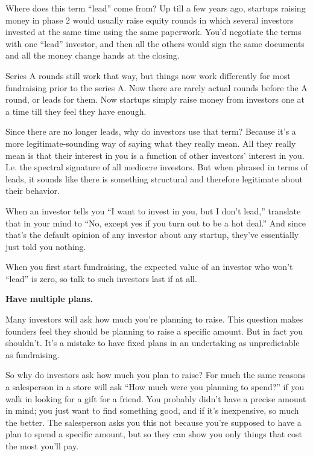 Where does this term ``lead'' come from? Up till a few years ago,
startups raising money in phase 2 would usually raise equity rounds in
which several investors invested at the same time using the same
paperwork. You'd negotiate the terms with one ``lead'' investor, and
then all the others would sign the same documents and all the money
change hands at the closing.

Series A rounds still work that way, but things now work differently for
most fundraising prior to the series A. Now there are rarely actual
rounds before the A round, or leads for them. Now startups simply raise
money from investors one at a time till they feel they have enough.

Since there are no longer leads, why do investors use that term? Because
it's a more legitimate-sounding way of saying what they really mean. All
they really mean is that their interest in you is a function of other
investors' interest in you. I.e. the spectral signature of all mediocre
investors. But when phrased in terms of leads, it sounds like there is
something structural and therefore legitimate about their behavior.

When an investor tells you ``I want to invest in you, but I don't
lead,'' translate that in your mind to ``No, except yes if you turn out
to be a hot deal.'' And since that's the default opinion of any investor
about any startup, they've essentially just told you nothing.

When you first start fundraising, the expected value of an investor who
won't ``lead'' is zero, so talk to such investors last if at all.

\textbf{Have multiple plans.}

Many investors will ask how much you're planning to raise. This question
makes founders feel they should be planning to raise a specific amount.
But in fact you shouldn't. It's a mistake to have fixed plans in an
undertaking as unpredictable as fundraising.

So why do investors ask how much you plan to raise? For much the same
reasons a salesperson in a store will ask ``How much were you planning
to spend?'' if you walk in looking for a gift for a friend. You probably
didn't have a precise amount in mind; you just want to find something
good, and if it's inexpensive, so much the better. The salesperson asks
you this not because you're supposed to have a plan to spend a specific
amount, but so they can show you only things that cost the most you'll
pay.

